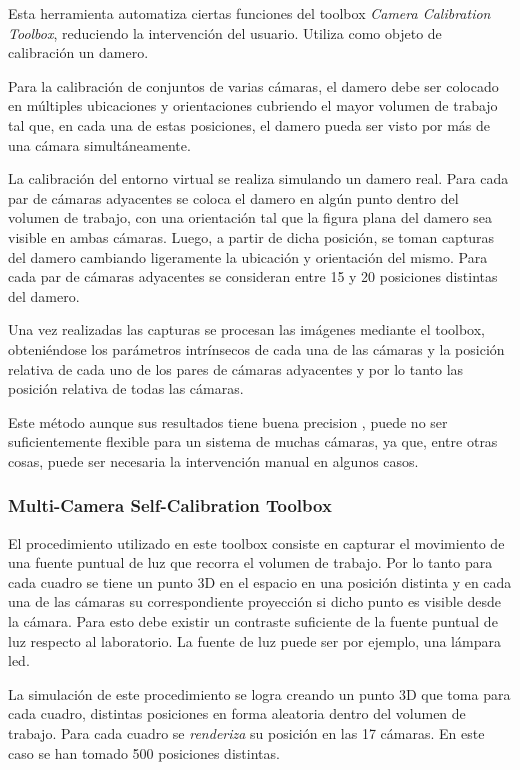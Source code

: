 Esta herramienta automatiza ciertas funciones del toolbox \textit{Camera Calibration Toolbox}, reduciendo la intervención del usuario. Utiliza como objeto de calibración un damero.

Para la calibración de conjuntos de varias cámaras, el damero debe ser colocado en múltiples ubicaciones y orientaciones cubriendo el mayor volumen de trabajo tal que, en cada una de estas posiciones, el damero pueda ser visto por más de una cámara simultáneamente.

La calibración del entorno virtual se realiza simulando un damero real. Para cada par de cámaras adyacentes se coloca el damero en algún punto dentro del volumen de trabajo, con una orientación tal que la figura plana del damero sea visible en ambas cámaras. Luego, a partir de dicha posición, se toman capturas del damero cambiando ligeramente la ubicación y orientación del mismo. Para cada par de cámaras adyacentes se consideran entre 15 y 20 posiciones distintas del damero.

Una vez realizadas las capturas se procesan  las imágenes mediante el toolbox, obteniéndose los parámetros intrínsecos de cada una de las cámaras y la posición relativa de cada uno de los pares de cámaras adyacentes y por lo tanto las posición relativa de todas las cámaras.


Este método aunque sus resultados tiene buena precision \cite{zhang_libro}, puede no ser suficientemente flexible para un sistema de muchas cámaras, ya que, entre otras cosas, puede ser necesaria la intervención manual en algunos casos.



\subsubsection{ Multi-Camera Self-Calibration Toolbox } \cite{toolbox_led}
 
 El procedimiento utilizado en este toolbox consiste en capturar el movimiento de una fuente puntual de luz que recorra el volumen de trabajo. Por lo tanto para cada cuadro se tiene un punto 3D en el espacio en una posición distinta y en cada una de las cámaras su correspondiente proyección si dicho punto es visible desde la cámara. Para esto debe existir un contraste suficiente de la fuente puntual de luz respecto al laboratorio. La fuente de luz puede ser por ejemplo, una lámpara led.
 
La simulación de este procedimiento se logra creando un punto 3D que toma para cada cuadro, distintas posiciones en forma aleatoria dentro del volumen de trabajo. Para cada cuadro se \textit{renderiza} su posición en las 17 cámaras. En este caso se han tomado 500 posiciones distintas.

